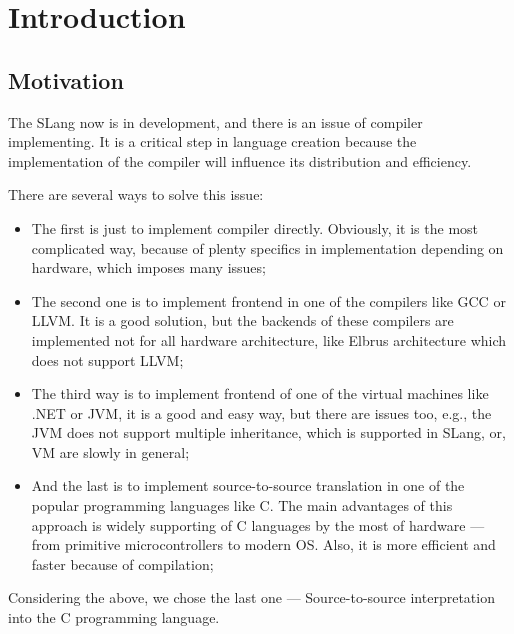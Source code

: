 
\chapter{Introduction}
\label{chap:intro}

\section{Motivation}
The SLang now is in development, and there is an issue of compiler implementing. It is a critical step in language creation because the implementation of the compiler will influence its distribution and efficiency.

There are several ways to solve this issue: 
\begin{itemize}
    \item The first is just to implement compiler directly. Obviously, it is the most complicated way, because of plenty specifics in implementation depending on hardware, which imposes many issues;
    \item The second one is to implement frontend in one of the compilers like GCC or LLVM. It is a good solution, but the backends of these compilers are implemented not for all hardware architecture, like Elbrus architecture which does not support LLVM;
    \item The third way is to implement frontend of one of the virtual machines like .NET or JVM, it is a good and easy way, but there are issues too, e.g., the JVM does not support multiple inheritance, which is supported in SLang, or, VM are slowly in general;
    \item And the last is to implement source-to-source translation in one of the popular programming languages like C. The main advantages of this approach is widely supporting of C languages by the most of hardware --- from primitive microcontrollers to modern OS. Also, it is more efficient and faster because of compilation;
\end{itemize}
Considering the above, we chose the last one --- Source-to-source interpretation into the C programming language.
\label{sec:section}